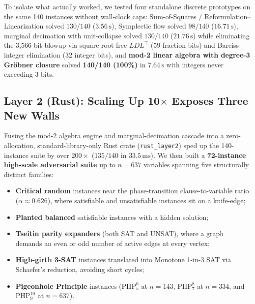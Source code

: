 \documentclass[11pt]{article}
\begin{document}
To isolate what actually worked, we tested four standalone discrete prototypes on the same 140 instances without wall-clock caps: Sum-of-Squares / Reformulation--Linearization solved $130/140$ ($3.56\,\text{s}$), Symplectic flow solved $98/140$ ($16.71\,\text{s}$), marginal decimation with unit-collapse solved $130/140$ ($21.76\,\text{s}$) while eliminating the 3,566-bit blowup via square-root-free $LDL^\top$ ($59$ fraction bits) and Bareiss integer elimination ($32$ integer bits), and \textbf{mod-2 linear algebra with degree-3 Gr\"obner closure} solved \textbf{140/140 (100\%)} in $7.64\,\text{s}$ with integers never exceeding 3 bits.

\subsection{Layer 2 (Rust): Scaling Up \texorpdfstring{10$\times$}{10x} Exposes Three New Walls}

Fusing the mod-2 algebra engine and marginal-decimation cascade into a zero-allocation, standard-library-only Rust crate (\texttt{rust\_layer2}) sped up the 140-instance suite by over $200\times$ ($135/140$ in $33.5\,\text{ms}$). We then built a \textbf{72-instance high-scale adversarial suite} up to $n = 637$ variables spanning five structurally distinct families:
\begin{itemize}
  \item \textbf{Critical random} instances near the phase-transition clause-to-variable ratio ($\alpha \approx 0.626$), where satisfiable and unsatisfiable instances sit on a knife-edge;
  \item \textbf{Planted balanced} satisfiable instances with a hidden solution;
  \item \textbf{Tseitin parity expanders} (both SAT and UNSAT), where a graph demands an even or odd number of active edges at every vertex;
  \item \textbf{High-girth 3-SAT} instances translated into Monotone 1-in-3 SAT via Schaefer's reduction, avoiding short cycles;
  \item \textbf{Pigeonhole Principle} instances ($\mathrm{PHP}_5^6$ at $n = 143$, $\mathrm{PHP}_7^8$ at $n = 334$, and $\mathrm{PHP}_9^{10}$ at $n = 637$).
\end{itemize}
\end{document}
